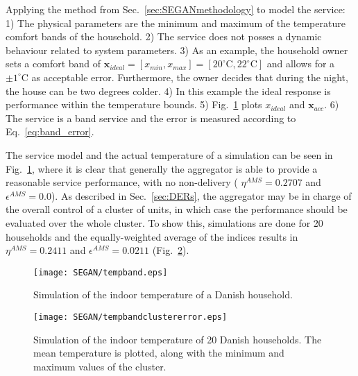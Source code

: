 Applying the method from Sec.~\ref{sec:SEGANmethodology} to model the service: 1) The physical parameters are the minimum and maximum of the temperature comfort bands of the household. 2) The service does not posses a dynamic behaviour related to system parameters. 3) As an example, the household owner sets a comfort band of $\mathbf{x}_{ideal} = [x_{min},x_{max}] = [20 ^{\circ}\text{C},22^{\circ}\text{C}]$ and allows for a $\pm 1 ^{\circ}\text{C}$ as acceptable error. Furthermore, the owner decides that during the night, the house can be two degrees colder. 4) In this example the ideal response is performance within the temperature bounds. 5) Fig.~\ref{fig:tempband} plots $x_{ideal}$ and $\mathbf{x}_{acc}$. 6) The service is a band service and the error is measured according to Eq.~\eqref{eq:band_error}.

The service model and the actual temperature of a simulation can be seen in Fig.~\ref{fig:tempband}, where it is clear that generally the aggregator is able to provide a reasonable service performance, with no non-delivery ( $\eta^{AMS} = 0.2707$ and $\epsilon^{AMS} = 0.0$). As described in Sec.~\ref{sec:DERs}, the aggregator may be in charge of the overall control of a cluster of units, in which case the performance should be evaluated over the whole cluster. To show this, simulations are done for 20 households and the equally-weighted average of the indices results in $\eta^{AMS} = 0.2411$ and $\epsilon^{AMS} = 0.0211$ (Fig.~\ref{fig:tempbandclustererror}).

\begin{figure}
\centering
\texttt{[image: SEGAN/tempband.eps]}
\caption{Simulation of the indoor temperature of a Danish household.}
\label{fig:tempband}
\end{figure}

\begin{figure}
\centering
\texttt{[image: SEGAN/tempbandclustererror.eps]}
\caption{Simulation of the indoor temperature of 20 Danish households. The mean temperature is plotted, along with the minimum and maximum values of the cluster.}
\label{fig:tempbandclustererror}
\end{figure}
